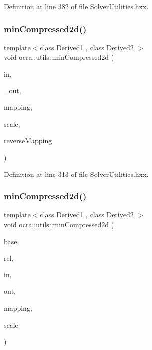 Definition at line 382 of file Solver\+Utilities.\+hxx.

\hypertarget{namespaceocra_1_1utils_aef09b232677b6a4a8d6177c04345f1d3}{}\label{namespaceocra_1_1utils_aef09b232677b6a4a8d6177c04345f1d3} 
\subsubsection{\texorpdfstring{min\+Compressed2d()}{minCompressed2d()}\hspace{0.1cm}{\footnotesize\ttfamily [1/2]}}
{\footnotesize\ttfamily template$<$class Derived1 , class Derived2 $>$ \\
void ocra\+::utils\+::min\+Compressed2d (\begin{DoxyParamCaption}\item[{const Matrix\+Base$<$ Derived1 $>$ \&}]{in,  }\item[{Matrix\+Base$<$ Derived2 $>$ const \&}]{\+\_\+out,  }\item[{const std\+::vector$<$ int $>$ \&}]{mapping,  }\item[{double}]{scale,  }\item[{bool}]{reverse\+Mapping }\end{DoxyParamCaption})\hspace{0.3cm}{\ttfamily [inline]}}



Definition at line 313 of file Solver\+Utilities.\+hxx.

\hypertarget{namespaceocra_1_1utils_a9b0fce276b5edf71568e40517bf567ac}{}\label{namespaceocra_1_1utils_a9b0fce276b5edf71568e40517bf567ac} 
\subsubsection{\texorpdfstring{min\+Compressed2d()}{minCompressed2d()}\hspace{0.1cm}{\footnotesize\ttfamily [2/2]}}
{\footnotesize\ttfamily template$<$class Derived1 , class Derived2 $>$ \\
void ocra\+::utils\+::min\+Compressed2d (\begin{DoxyParamCaption}\item[{const \hyperlink{classocra_1_1Variable}{Variable} \&}]{base,  }\item[{const \hyperlink{classocra_1_1Variable}{Variable} \&}]{rel,  }\item[{const Matrix\+Base$<$ Derived1 $>$ \&}]{in,  }\item[{Matrix\+Base$<$ Derived2 $>$ const \&}]{out,  }\item[{std\+::vector$<$ int $>$ \&}]{mapping,  }\item[{double}]{scale }\end{DoxyParamCaption})\hspace{0.3cm}{\ttfamily [inline]}}



